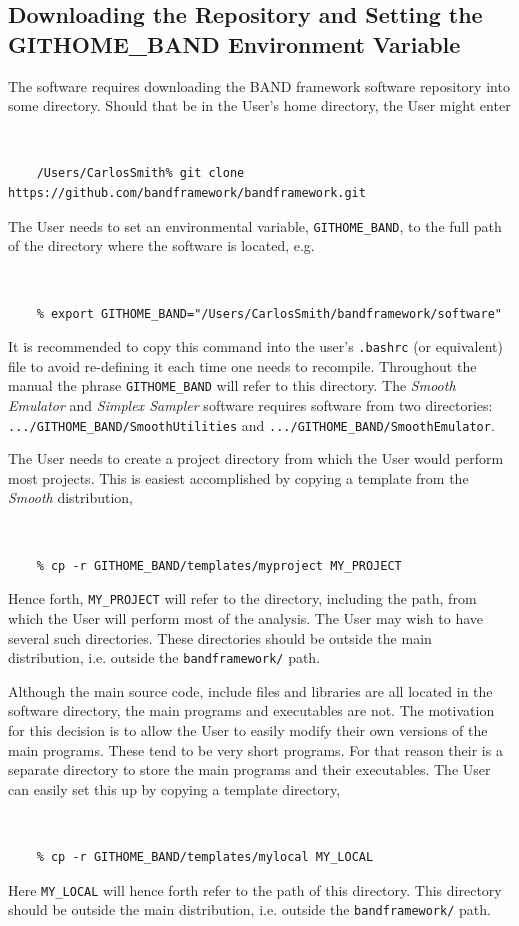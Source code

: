 \documentclass[UserManual.tex]{subfiles}
\begin{document}
\subsection{Downloading the Repository and Setting the GITHOME\_BAND Environment Variable}

The software requires downloading the BAND framework software repository into some directory. Should that be in the User's home directory, the User might enter
{\tt 
\begin{verbatim}
    /Users/CarlosSmith% git clone https://github.com/bandframework/bandframework.git
\end{verbatim}
}
The User needs to set an environmental variable, {\tt GITHOME\_BAND}, to the full path of the directory where the software is located, e.g. 
{\tt
\begin{verbatim}
    % export GITHOME_BAND="/Users/CarlosSmith/bandframework/software"
\end{verbatim}
}
It is recommended to copy this command into the user's {\tt .bashrc} (or equivalent) file to avoid re-defining it each time one needs to recompile. Throughout the manual the phrase {\tt GITHOME\_BAND} will refer to this directory. The {\it Smooth Emulator} and {\it Simplex Sampler} software requires software from two directories: {\tt .../GITHOME\_BAND/SmoothUtilities} and {\tt .../GITHOME\_BAND/SmoothEmulator}.

The User needs to create a project directory from which the User would perform most projects. This is easiest accomplished by copying a template from the {\it Smooth} distribution,
{\tt
\begin{verbatim}
    % cp -r GITHOME_BAND/templates/myproject MY_PROJECT
\end{verbatim}
}
Hence forth, {\tt MY\_PROJECT} will refer to the directory, including the path, from which the User will perform most of the analysis. The User may wish to have several such directories. These directories should be outside the main distribution, i.e. outside the {\tt bandframework/} path. 

Although the main source code, include files and libraries are all located in the software directory, the main programs and executables are not. The motivation for this decision is to allow the User to easily modify their own versions of the main programs. These tend to be very short programs. For that reason their is a separate directory to store the main programs and their executables. The User can easily set this up by copying a template directory,
{\tt 
\begin{verbatim}
    % cp -r GITHOME_BAND/templates/mylocal MY_LOCAL
\end{verbatim}
}
Here {\tt MY\_LOCAL} will hence forth refer to the path of this directory. This directory should be outside the main distribution, i.e. outside the {\tt bandframework/} path. 
\end{document}
